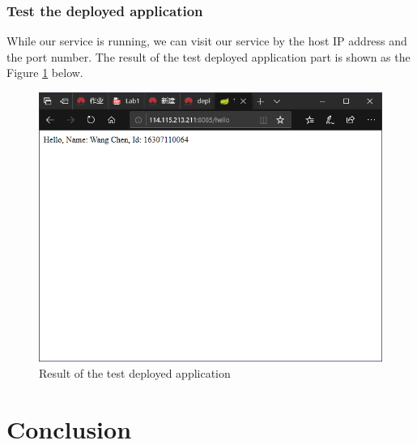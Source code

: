 \documentclass[a4paper]{report}
\begin{document}
\subsection{Test the deployed application}
While our service is running, we can visit our service by the host IP address and the port number. The result of the test deployed application part is shown as the Figure \ref{14} below.
\begin{figure}
  \centering
  \includegraphics[width=12cm]{Figures/Capture11.png}
  \caption{Result of the test deployed application}\label{14}
\end{figure}
\chapter{Conclusion}
\end{document}
